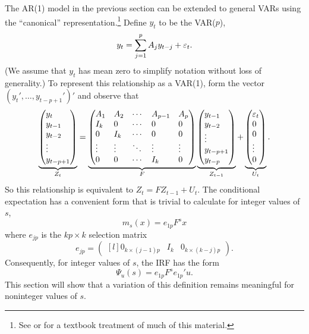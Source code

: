 \documentclass[12pt,fleqn]{article}
\begin{document}
The AR(1) model in the previous section can be extended to general
VARs using the ``canonical'' representation.\footnote{%
  See \citet{Ham:94} or \citet{HaS:13} for a textbook treatment of
  much of this material.} %
Define $y_t$ to be the VAR($p$),
\[
y_t = \sum_{j=1}^p A_j y_{t-j} + \varepsilon_t.
\]
(We assume that $y_t$ has mean zero to simplify notation without loss
of generality.) To represent this relationship as a VAR(1), form the
vector $(y_t',\dots,y_{t-p+1}')'$ and observe that
\begin{equation}
\label{eq:7}
\underbrace{\begin{pmatrix*}[l]
  y_t \\ y_{t-1} \\ y_{t-2} \\ \vdots \\ y_{t-p+1}
\end{pmatrix*}}_{Z_t}
=
\underbrace{\begin{pmatrix*}[l]
  A_1 & A_2 & \cdots & A_{p-1} & A_p \\
  I_k & 0   & \cdots & 0 & 0 \\
  0  & I_k  & \cdots & 0 & 0 \\
  \vdots & \vdots & \ddots & \vdots & \vdots \\
  0 & 0 & \cdots & I_k & 0
\end{pmatrix*}}_{F}
\underbrace{\begin{pmatrix*}[l]
  y_{t-1} \\ y_{t-2} \\ \vdots \\ y_{t-p+1} \\ y_{t-p}
\end{pmatrix*}}_{Z_{t-1}}
+
\underbrace{\begin{pmatrix*}[l]
  \vep_{t} \\ 0 \\ 0 \\ \vdots \\ 0
\end{pmatrix*}}_{U_t}.
\end{equation}
So this relationship is equivalent to $Z_t = F Z_{t-1} + U_t$. The
conditional expectation has a convenient form that is trivial to
calculate for integer values of $s$,
\begin{equation*}
  m_s(x) = e_{1p} F^s x
\end{equation*}
where $e_{jp}$ is the $k p \times k$ selection matrix
\begin{equation*}
  e_{jp} = \begin{pmatrix*}[l]
    0_{k \times (j-1)p} & I_k & 0_{k \times (k - j)p}
  \end{pmatrix*}.
\end{equation*}
Consequently, for integer values of $s$, the IRF has the form
\begin{equation*}
  \Psi_u(s) = e_{1p} F^s e_{1p}' u.
\end{equation*}
This section will show that a variation of
this definition remains meaningful for noninteger values of $s$.
\end{document}

